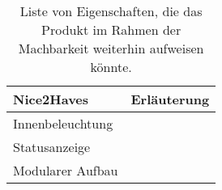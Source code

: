 		\newpage
		\begin{table}[h]
			\centering
			\caption{Liste von Eigenschaften, die das Produkt im Rahmen der Machbarkeit weiterhin aufweisen könnte.}
			\begin{tabular}{@{}p{.49\textwidth}p{}@{}}
				\toprule
				\textbf{Nice2Haves} 							& \textbf{Erläuterung} \\
				\midrule
				Innenbeleuchtung 								& \\
				Statusanzeige									& \\
				Modularer Aufbau								& \\
				\bottomrule
			\end{tabular}
		\end{table}